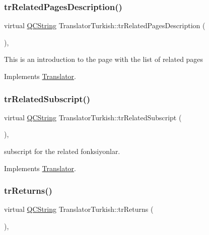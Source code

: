\subsubsection{\texorpdfstring{trRelatedPagesDescription()}{trRelatedPagesDescription()}}
{\footnotesize\ttfamily virtual \mbox{\hyperlink{class_q_c_string}{Q\+C\+String}} Translator\+Turkish\+::tr\+Related\+Pages\+Description (\begin{DoxyParamCaption}{ }\end{DoxyParamCaption})\hspace{0.3cm}{\ttfamily [inline]}, {\ttfamily [virtual]}}

This is an introduction to the page with the list of related pages 

Implements \mbox{\hyperlink{class_translator}{Translator}}.

\mbox{\label{class_translator_turkish_a18f0024cfef2da5eea621a48c7858e3d}} 
\subsubsection{\texorpdfstring{trRelatedSubscript()}{trRelatedSubscript()}}
{\footnotesize\ttfamily virtual \mbox{\hyperlink{class_q_c_string}{Q\+C\+String}} Translator\+Turkish\+::tr\+Related\+Subscript (\begin{DoxyParamCaption}{ }\end{DoxyParamCaption})\hspace{0.3cm}{\ttfamily [inline]}, {\ttfamily [virtual]}}

subscript for the related fonksiyonlar. 

Implements \mbox{\hyperlink{class_translator}{Translator}}.

\mbox{\label{class_translator_turkish_af496918a09fca21008ec901f68422748}} 
\subsubsection{\texorpdfstring{trReturns()}{trReturns()}}
{\footnotesize\ttfamily virtual \mbox{\hyperlink{class_q_c_string}{Q\+C\+String}} Translator\+Turkish\+::tr\+Returns (\begin{DoxyParamCaption}{ }\end{DoxyParamCaption})\hspace{0.3cm}{\ttfamily [inline]}, {\ttfamily [virtual]}}

